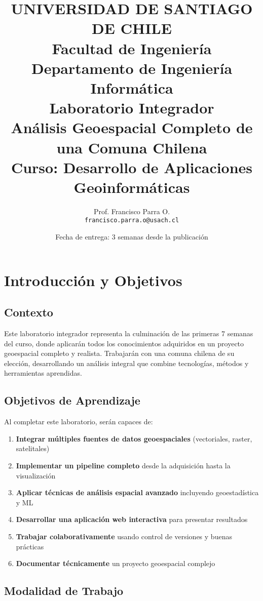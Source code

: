 \documentclass[12pt,a4paper]{article}
\title{
    \vspace{-2cm}
    \Large{UNIVERSIDAD DE SANTIAGO DE CHILE} \\
    \large{Facultad de Ingeniería} \\
    \large{Departamento de Ingeniería Informática} \\
    \vspace{1cm}
    \LARGE{\textbf{Laboratorio Integrador}} \\
    \Large{\textbf{Análisis Geoespacial Completo de una Comuna Chilena}} \\
    \vspace{0.5cm}
    \large{Curso: Desarrollo de Aplicaciones Geoinformáticas}
}
\author{
    Prof. Francisco Parra O. \\
    \texttt{francisco.parra.o@usach.cl}
}
\date{Fecha de entrega: 3 semanas desde la publicación}
\begin{document}
\maketitle
\thispagestyle{empty}
\newpage

\tableofcontents
\newpage

\section{Introducción y Objetivos}

\subsection{Contexto}

Este laboratorio integrador representa la culminación de las primeras 7 semanas del curso, donde aplicarán todos los conocimientos adquiridos en un proyecto geoespacial completo y realista. Trabajarán con una comuna chilena de su elección, desarrollando un análisis integral que combine tecnologías, métodos y herramientas aprendidas.

\subsection{Objetivos de Aprendizaje}

Al completar este laboratorio, serán capaces de:

\begin{enumerate}
    \item \textbf{Integrar múltiples fuentes de datos geoespaciales} (vectoriales, raster, satelitales)
    \item \textbf{Implementar un pipeline completo} desde la adquisición hasta la visualización
    \item \textbf{Aplicar técnicas de análisis espacial avanzado} incluyendo geoestadística y ML
    \item \textbf{Desarrollar una aplicación web interactiva} para presentar resultados
    \item \textbf{Trabajar colaborativamente} usando control de versiones y buenas prácticas
    \item \textbf{Documentar técnicamente} un proyecto geoespacial complejo
\end{enumerate}

\subsection{Modalidad de Trabajo}
\end{document}
